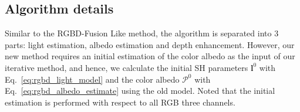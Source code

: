
\subsection{Algorithm details}
Similar to the RGBD-Fusion Like method, the algorithm is separated into 3 parts: light estimation, albedo estimation and depth enhancement.
However, our new method requires an initial estimation of the color albedo as the input of our iterative method, and hence, we calculate the initial SH parameters $\mathbf{l}^{0}$ with Eq.~\ref{eq:rgbd_light_model} and the color albedo $\mathcal{P}^{0}$ with Eq.~\ref{eq:rgbd_albedo_estimate} using the old model.
Noted that the initial estimation is performed with respect to all RGB three channels.

